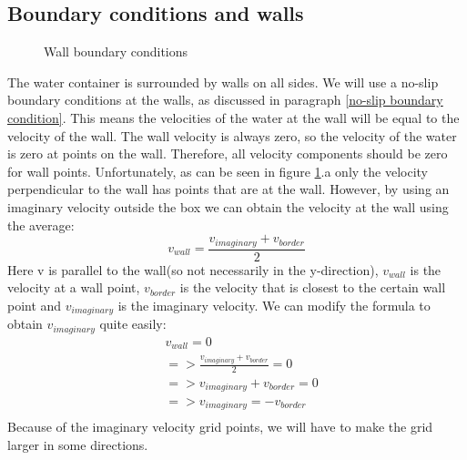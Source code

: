 \documentclass{article}
\begin{document}
\subsection{Boundary conditions and walls}
\begin{figure}[ht]
\centering
{}

\caption{Wall boundary conditions} \label{wall boundary conditions}
\end{figure}

The water container is surrounded by walls on all sides.  We will use a no-slip boundary conditions at the walls, as discussed in paragraph \ref{no-slip boundary condition}\cite{MAC}. This means the velocities of the water at the wall will be equal to the velocity of the wall. The wall velocity is always zero, so the velocity of the water is zero at points on the wall. Therefore, all velocity components should be zero for wall points\cite{MAC}. Unfortunately, as can be seen in figure \ref{wall boundary conditions}.a only the velocity perpendicular to the wall has points that are at the wall. However, by using an imaginary velocity outside the box we can obtain the velocity at the wall using the average\cite{MAC}:
\[v_{wall}=\frac{v_{imaginary}+v_{border}}{2}\]
Here v is parallel to the wall(so not necessarily in the y-direction), \(v_{wall}\) is the velocity at a wall point, \(v_{border}\) is the velocity that is closest to the certain wall point and \(v_{imaginary}\) is the imaginary velocity. We can modify the formula to obtain \(v_{imaginary}\) quite easily:
\[\begin{split}
&v_{wall}=0\\
&=>\frac{v_{imaginary}+v_{border}}{2}=0\\
&=>v_{imaginary}+v_{border}=0\\
&=>v_{imaginary}=-v_{border}\\
\end{split}\]
Because of the imaginary velocity grid points, we will have to make the grid larger in some directions.\\ \\
\end{document}

